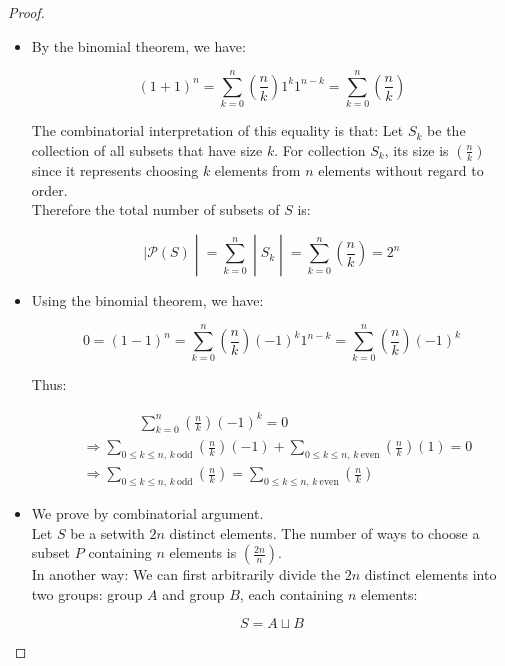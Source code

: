 \documentclass{qlnotes-export}
\begin{document}
\begin{proof}

\begin{itemize}
\item
  By the binomial theorem, we have:

  \[(1 + 1)^{n} = \sum\limits_{k = 0}^{n}\left( \frac{n}{k} \right)1^{k}1^{n - k} = \sum\limits_{k = 0}^{n}\left( \frac{n}{k} \right)\]

  The combinatorial interpretation of this equality is that: Let \(S_{k}\) be the collection of all subsets that have size \(k\). For collection \(S_{k}\), its size is \(\left( \frac{n}{k} \right)\) since it represents choosing \(k\) elements from \(n\) elements without regard to order.\\
  Therefore the total number of subsets of \(S\) is:

  \[\left. |\mathcal{P}(S) \middle| = \sum\limits_{k = 0}^{n} \middle| S_{k} \middle| = \sum\limits_{k = 0}^{n}\left( \frac{n}{k} \right) = 2^{n} \right.\]
\item
  Using the binomial theorem, we have:

  \[0 = (1 - 1)^{n} = \sum\limits_{k = 0}^{n}\left( \frac{n}{k} \right)( - 1)^{k}1^{n - k} = \sum\limits_{k = 0}^{n}\left( \frac{n}{k} \right)( - 1)^{k}\]

  Thus:

  \[\begin{matrix}
   & {\quad\quad\quad\quad\sum\limits_{k = 0}^{n}\left( \frac{n}{k} \right)( - 1)^{k} = 0} \\
   & {\Longrightarrow\sum\limits_{0 \leq k \leq n,\, k\ \text{odd}}\left( \frac{n}{k} \right)( - 1) + \sum\limits_{0 \leq k \leq n,\, k\ \text{even}}\left( \frac{n}{k} \right)(1) = 0} \\
   & {\Longrightarrow\sum\limits_{0 \leq k \leq n,\, k\ \text{odd}}\left( \frac{n}{k} \right) = \sum\limits_{0 \leq k \leq n,\, k\ \text{even}}\left( \frac{n}{k} \right)}
  \end{matrix}\]
\item
  We prove by combinatorial argument.\\
  Let \(S\) be a setwith \(2n\) distinct elements. The number of ways to choose a subset \(P\) containing \(n\) elements is \(\left( \frac{2n}{n} \right)\).\\
  In another way: We can first arbitrarily divide the \(2n\) distinct elements into two groups: group \(A\) and group \(B\), each containing \(n\) elements:

  \[S = A \sqcup B\]


\end{itemize}
\end{proof}
\end{document}

